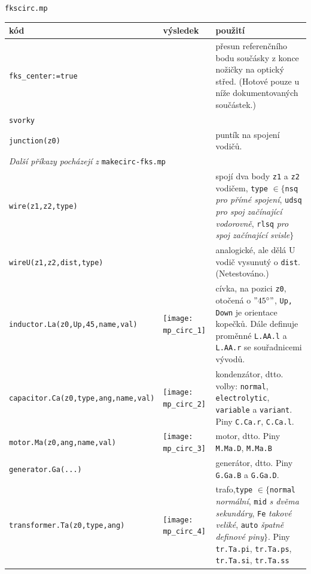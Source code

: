 \documentclass[a4paper,10pt]{article}
\begin{document}
{\centering\large\texttt{fkscirc.mp}\nopagebreak\\\vspace{-12pt}\noindent}
\begin{tabularx}{\textwidth}{|l|l|X|}\hline
    kód & výsledek & použití\\\hline
    \verb+fks_center:=true+ && přesun referenčního bodu součásky z konce 
	nožičky na optický střed. (Hotové pouze u níže dokumentovaných
	součástek.)\\\hline
    \verb+svorky+ & &\\\hline
    \verb+junction(z0)+ & & puntík na spojení vodičů.\\\hline
    \multicolumn{3}{|l|}{\emph{Další příkazy pocházejí z} {\tt makecirc-fks.mp}}\\\hline
    \verb+wire(z1,z2,type)+&&spojí dva body \verb+z1+ a \verb+z2+ vodičem,
	\verb+type+ $\in\{$\verb+nsq+ {\it pro přímé spojení\/}, \verb+udsq+ 
	{\it pro spoj začínající vodorovně\/}, \verb+rlsq+ {\it pro spoj 
	začínající svisle\/}$\}$\\\hline
    \verb+wireU(z1,z2,dist,type)+&&analogické, ale dělá U vodič vysunutý 
	o \verb+dist+. (Netestováno.)\\\hline
    \verb+inductor.La(z0,Up,45,name,val)+&
	\raise-12pt\hbox{\texttt{[image: mp\_circ\_1]}}&
	cívka, na pozici \verb+z0+, otočená o $"45^\circ"$, \verb+Up, Down+ je 
	orientace kopečků. Dále definuje proměnné \verb+L.AA.l+ a \verb+L.AA.r+
	se souřadnicemi vývodů.\\\hline
    \verb+capacitor.Ca(z0,type,ang,name,val)+&
	\raise-12pt\hbox{\texttt{[image: mp\_circ\_2]}}&
	kondenzátor, dtto. volby: \verb+normal+, \verb+electrolytic+, 
	\verb+variable+ a \verb+variant+. Piny \verb+C.Ca.r+, \verb+C.Ca.l+.
\\\hline
    \verb+motor.Ma(z0,ang,name,val)+&
	\raise-12pt\hbox{\texttt{[image: mp\_circ\_3]}}&
	motor, dtto. Piny \verb+M.Ma.D+, \verb+M.Ma.B+\\\hline
    \verb+generator.Ga(...)+&&generátor, dtto. Piny \verb+G.Ga.B+ a 
	\verb+G.Ga.D+.\\\hline
    \verb+transformer.Ta(z0,type,ang)+&
	\raise-36pt\hbox{\texttt{[image: mp\_circ\_4]}}&
	trafo,\verb+type+ $\in\{$\verb+normal+ {\it normální}, 
	\verb+mid+ {\it s dvěma sekundáry}, \verb+Fe+ {\it takové veliké}, 
	\verb+auto+ {\it špatně definové piny}$\}$. Piny \verb+tr.Ta.pi+, 
	\verb+tr.Ta.ps+, \verb+tr.Ta.si+, \verb+tr.Ta.ss+ 

\end{tabularx}
\end{document}
